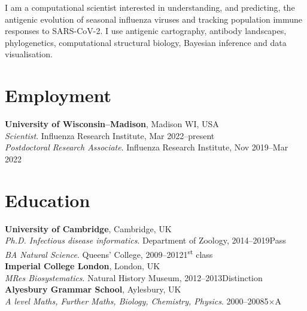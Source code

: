 \documentclass[margin]{res}
\begin{document}
\begin{resume}

	I am a computational scientist interested in understanding, and predicting,
	the antigenic evolution of seasonal influenza viruses and tracking
	population immune responses to SARS-CoV-2. I use antigenic cartography,
	antibody landscapes, phylogenetics, computational structural biology,
	Bayesian inference and data visualisation.

    \section{Employment}
    \textbf{University of Wisconsin--Madison}, Madison WI, USA\\
    {\sl Scientist}. Influenza Research Institute, Mar 2022--present\\
    {\sl Postdoctoral Research Associate}. Influenza Research Institute, Nov 2019--Mar 2022

	\section{Education}
	\textbf{University of Cambridge}, Cambridge, UK\\
	{\sl Ph.D. Infectious disease informatics}. Department of Zoology, 2014--2019\hfill Pass\\
	{\sl BA Natural Science}. Queens' College, 2009--2012\hfill 1\textsuperscript{st} class\\
	\textbf{Imperial College London}, London, UK\\
	{\sl MRes Biosystematics}. Natural History Museum, 2012--2013\hfill Distinction\\
	\textbf{Alyesbury Grammar School}, Aylesbury, UK\\
	{\sl A level Maths, Further Maths, Biology, Chemistry, Physics}. 2000--2008\hfill 5$\times$A


\end{resume}
\end{document}
